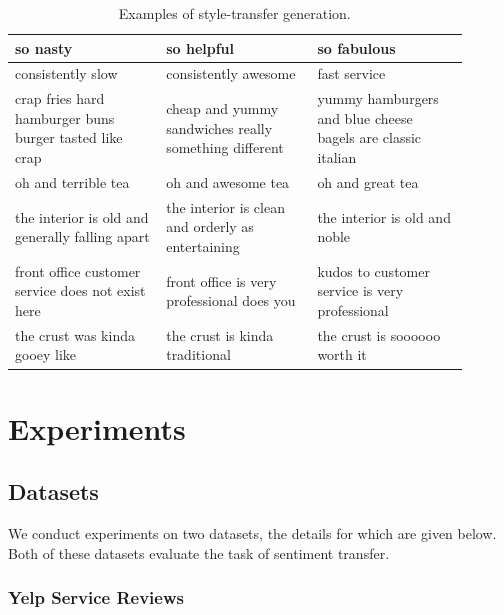 \documentclass[11pt,a4paper]{article}
\begin{document}
\begin{table}[ht]
\begin{tabular}{| p{0.3\linewidth} | p{0.3\linewidth} | p{0.3\linewidth} |}
		\hline
		\hline
		so nasty                                               & so helpful                                                     & so fabulous                                                 \\
		\hline
		consistently slow                                      & consistently awesome                                           & fast service                                                \\
		\hline
		crap fries hard hamburger buns burger tasted like crap & cheap and yummy sandwiches really something different          & yummy hamburgers and blue cheese bagels are classic italian \\
		\hline
		oh and terrible tea                                    & oh and awesome tea                                             & oh and great tea                                            \\
		\hline
		the interior is old and generally falling apart        & the interior is clean and orderly as entertaining              & the interior is old and noble                               \\
		\hline
		front office customer service does not exist here      & front office is very professional does you                     & kudos to customer service is very professional              \\
		\hline
		the crust was kinda gooey like                         & the crust is kinda traditional                                 & the crust is soooooo worth it                               \\
		\hline
	\end{tabular}
	\caption{Examples of style-transfer generation.}
	\label{tab:transfer-samples}
\end{table}

\section{Experiments}

\subsection{Datasets}

We conduct experiments on two datasets, the details for which are given below. Both of these datasets evaluate the task of sentiment transfer.

\subsubsection{Yelp Service Reviews}
\end{document}
